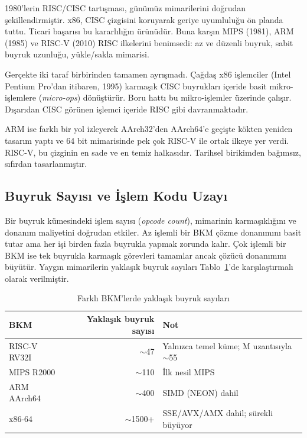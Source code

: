 \begin{karsilastirma}
1980'lerin RISC/CISC tartışması, günümüz mimarilerini doğrudan şekillendirmiştir. x86, CISC çizgisini koruyarak geriye uyumluluğu ön planda tuttu. Ticari başarısı bu kararlılığın ürünüdür. Buna karşın MIPS (1981), ARM (1985) ve RISC-V (2010) RISC ilkelerini benimsedi: az ve düzenli buyruk, sabit buyruk uzunluğu, yükle/sakla mimarisi.

Gerçekte iki taraf birbirinden tamamen ayrışmadı. Çağdaş x86 işlemciler (Intel Pentium Pro'dan itibaren, 1995) karmaşık CISC buyrukları içeride basit mikro-işlemlere (\emph{micro-ops}) dönüştürür. Boru hattı bu mikro-işlemler üzerinde çalışır. Dışarıdan CISC görünen işlemci içeride RISC gibi davranmaktadır.

ARM ise farklı bir yol izleyerek AArch32'den AArch64'e geçişte kökten yeniden tasarım yaptı ve 64 bit mimarisinde pek çok RISC-V ile ortak ilkeye yer verdi. RISC-V, bu çizginin en sade ve en temiz halkasıdır. Tarihsel birikimden bağımsız, sıfırdan tasarlanmıştır.
\end{karsilastirma}

\subsection{Buyruk Sayısı ve İşlem Kodu Uzayı}
\label{sec:buyruk-sayisi}

Bir buyruk kümesindeki işlem sayısı (\emph{opcode count}), mimarinin karmaşıklığını ve donanım maliyetini doğrudan etkiler. Az işlemli bir BKM çözme donanımını basit tutar ama her işi birden fazla buyrukla yapmak zorunda kalır. Çok işlemli bir BKM ise tek buyrukla karmaşık görevleri tamamlar ancak çözücü donanımını büyütür. Yaygın mimarilerin yaklaşık buyruk sayıları Tablo~\ref{tab:buyruk-sayilari}'de karşılaştırmalı olarak verilmiştir.

\begin{table}[H]
\centering
\caption{Farklı BKM'lerde yaklaşık buyruk sayıları}
\label{tab:buyruk-sayilari}
\footnotesize
\begin{tabular}{lrl}
\toprule
\textbf{BKM} & \textbf{Yaklaşık buyruk sayısı} & \textbf{Not} \\
\midrule
RISC-V RV32I  & $\sim$47   & Yalnızca temel küme; M uzantısıyla $\sim$55 \\
MIPS R2000    & $\sim$110  & İlk nesil MIPS \\
ARM AArch64   & $\sim$400  & SIMD (NEON) dahil \\
x86-64        & $\sim$1500+  & SSE/AVX/AMX dahil; sürekli büyüyor \\
\bottomrule
\end{tabular}
\end{table}

